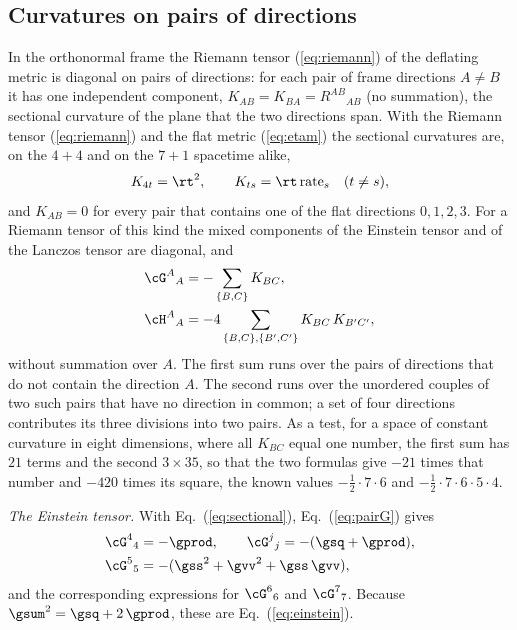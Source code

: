 \subsection{Curvatures on pairs of directions}

In the orthonormal frame the Riemann tensor (\ref{eq:riemann}) of the deflating metric is diagonal
on pairs of directions: for each pair of frame directions $A\ne B$ it has one independent component,
$K_{AB}=K_{BA}=R^{AB}{}_{AB}$ (no summation), the sectional curvature of the plane that the two
directions span. With the Riemann tensor (\ref{eq:riemann}) and the flat metric (\ref{eq:etam}) the
sectional curvatures are, on the $4+4$ and on the $7+1$ spacetime alike,
\begin{equation}
K_{4t}=\rt^{2},\qquad K_{ts}=\rt\,\mathrm{rate}_s\quad(t\ne s),
\label{eq:sectional}
\end{equation}
and $K_{AB}=0$ for every pair that contains one of the flat directions $0,1,2,3$. For a
Riemann tensor of this kind the mixed components of the Einstein tensor and of the Lanczos tensor
are diagonal, and
\begin{align}
\cG^{A}{}_{A}&=-\sum_{\{B,C\}}K_{BC},\label{eq:pairG}\\
\cH^{A}{}_{A}&=-4\sum_{\{B,C\},\{B',C'\}}K_{BC}\,K_{B'C'},
\label{eq:pairH}
\end{align}
without summation over $A$. The first sum runs over the pairs of directions that do not contain the
direction $A$. The second runs over the unordered couples of two such pairs that have no direction
in common; a set of four directions contributes its three divisions into two pairs. As a test, for a
space of constant curvature in eight dimensions, where all $K_{BC}$ equal one number, the first sum
has $21$ terms and the second $3\times35$, so that the two formulas give $-21$ times that number and
$-420$ times its square, the known values $-\tfrac12\cdot7\cdot6$ and
$-\tfrac12\cdot7\cdot6\cdot5\cdot4$.

\emph{The Einstein tensor.} With Eq.~(\ref{eq:sectional}), Eq.~(\ref{eq:pairG}) gives
\begin{equation}
\begin{aligned}
\cG^{4}{}_{4}&=-\gprod,\qquad\cG^{j}{}_{j}=-(\gsq+\gprod),\\
\cG^{5}{}_{5}&=-(\gss^{2}+\gvv^{2}+\gss\,\gvv),
\end{aligned}
\end{equation}
and the corresponding expressions for $\cG^{6}{}_{6}$ and $\cG^{7}{}_{7}$. Because
$\gsum^{2}=\gsq+2\,\gprod$, these are Eq.~(\ref{eq:einstein}).

